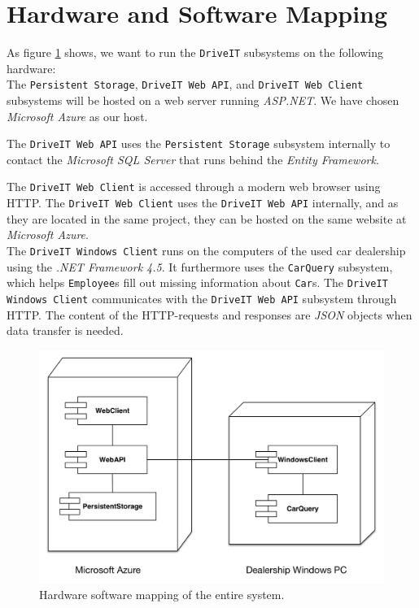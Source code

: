 \section{Hardware and Software Mapping}
As figure \ref{fig:Hardware-Software-Mapping} shows, we want to run the \texttt{DriveIT} subsystems on the following hardware:\\

The \texttt{Persistent Storage}, \texttt{DriveIT Web API}, and \texttt{DriveIT Web Client} subsystems will be hosted on a web server running \textit{ASP.NET}. We have chosen \textit{Microsoft Azure} as our host.

The \texttt{DriveIT Web API} uses the \texttt{Persistent Storage} subsystem internally to contact the \textit{Microsoft SQL Server} that runs behind the \textit{Entity Framework}.

The \texttt{DriveIT Web Client} is accessed through a modern web browser using HTTP. The \texttt{DriveIT Web Client} uses the \texttt{DriveIT Web API} internally, and as they are located in the same project, they can be hosted on the same website at \textit{Microsoft Azure}.\\

The \texttt{DriveIT Windows Client} runs on the computers of the used car dealership using the \textit{.NET Framework 4.5}. It furthermore uses the \texttt{CarQuery} subsystem, which helps \texttt{Employee}s fill out missing information about \texttt{Car}s. The \texttt{DriveIT Windows Client} communicates with the \texttt{DriveIT Web API} subsystem through HTTP. The content of the HTTP-requests and responses are \textit{JSON} objects when data transfer is needed.

\begin{figure}[H]
	\centering
	\includegraphics[width=\textwidth]{Figures/HardwareSoftwareMapping}
	\caption{Hardware software mapping of the entire system.}
	\label{fig:Hardware-Software-Mapping}
\end{figure}